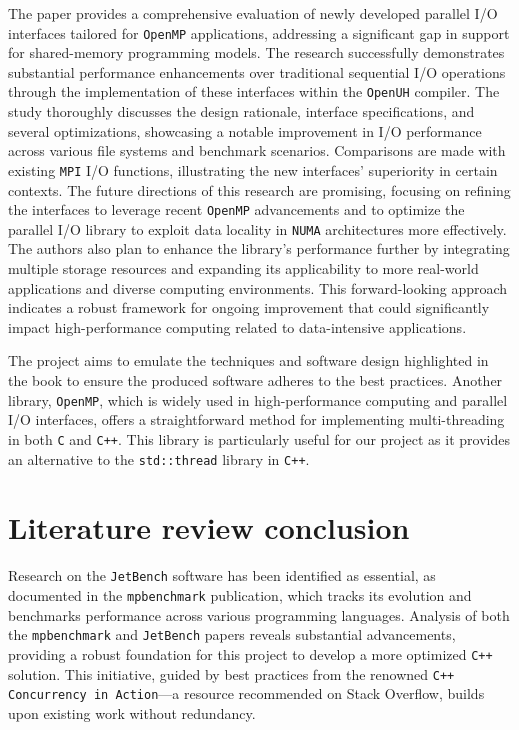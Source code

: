 The paper\cite{openmp_usage_hpc} provides a comprehensive evaluation of newly developed parallel I/O interfaces tailored for \texttt{OpenMP} applications, addressing a significant gap in support for shared-memory programming models. The research successfully demonstrates substantial performance enhancements over traditional sequential I/O operations through the implementation of these interfaces within the \texttt{OpenUH} compiler. The study thoroughly discusses the design rationale, interface specifications, and several optimizations, showcasing a notable improvement in I/O performance across various file systems and benchmark scenarios. Comparisons are made with existing \texttt{MPI} I/O functions, illustrating the new interfaces' superiority in certain contexts. The future directions of this research are promising, focusing on refining the interfaces to leverage recent \texttt{OpenMP} advancements and to optimize the parallel I/O library to exploit data locality in \texttt{NUMA} architectures more effectively. The authors also plan to enhance the library's performance further by integrating multiple storage resources and expanding its applicability to more real-world applications and diverse computing environments. This forward-looking approach indicates a robust framework for ongoing improvement that could significantly impact high-performance computing related to data-intensive applications.

The project aims to emulate the techniques and software design highlighted in the book\cite{c++_concurrency_in_action} to ensure the produced software adheres to the best practices. Another library, \texttt{OpenMP}, which is widely used in high-performance computing and parallel I/O interfaces\cite{openmp_usage_hpc}, offers a straightforward method for implementing multi-threading in both \texttt{C} and \texttt{C++}. This library is particularly useful for our project as it provides an alternative to the \texttt{std::thread} library in \texttt{C++}. 

\section{Literature review conclusion}

Research on the \texttt{JetBench} software has been identified as essential, as documented in the \texttt{mpbenchmark} publication\cite{mpbenchmark_paper}, which tracks its evolution and benchmarks performance across various programming languages. Analysis of both the \texttt{mpbenchmark} and \texttt{JetBench} papers\cite{JetBench_paper}\cite{mpbenchmark_paper} reveals substantial advancements, providing a robust foundation for this project to develop a more optimized \texttt{C++} solution. This initiative, guided by best practices from the renowned \texttt{C++ Concurrency in Action}\cite{c++_concurrency_in_action}—a resource recommended on Stack Overflow\cite{c++_books_stackoverflow}, builds upon existing work without redundancy.

